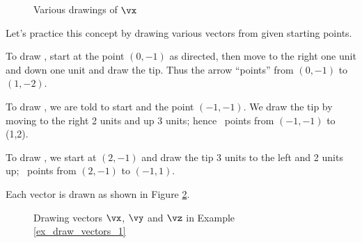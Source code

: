 \begin{figure}[h!]
\begin{center}
\end{center}
\caption{Various drawings of $\protect\vx$}
\label{fig:draw_vectors}
\end{figure}


Let's practice this concept by drawing various vectors from given starting points.\\

{To draw \vx, start at the point $(0,-1)$ as directed, then move to the right one unit and down one unit and draw the tip. Thus the arrow ``points'' from $(0,-1)$ to $(1,-2)$.

To draw \vy, we are told to start and the point $(-1,-1)$. We draw the tip by moving to the right 2 units and up 3 units; hence \vy\ points from $(-1,-1)$ to (1,2).

To draw \vz, we start at $(2,-1)$ and draw the tip 3 units to the left and 2 units up; \vz\ points from $(2,-1)$ to $(-1,1)$.

Each vector is drawn as shown in Figure \ref{fig:xyz}.}

\begin{figure}[h!]
\begin{center}
\end{center}
\caption{Drawing vectors $\protect\vx$, $\protect\vy$ and $\protect\vz$ in Example \ref{ex_draw_vectors_1}}
\label{fig:xyz}
\end{figure}


